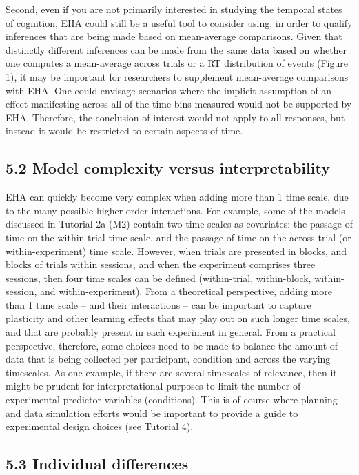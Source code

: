 \documentclass[
  man, donotrepeattitle,floatsintext]{apa6}
\begin{document}
Second, even if you are not primarily interested in studying the temporal states of cognition, EHA could still be a useful tool to consider using, in order to qualify inferences that are being made based on mean-average comparisons. Given that distinctly different inferences can be made from the same data based on whether one computes a mean-average across trials or a RT distribution of events (Figure 1), it may be important for researchers to supplement mean-average comparisons with EHA. One could envisage scenarios where the implicit assumption of an effect manifesting across all of the time bins measured would not be supported by EHA. Therefore, the conclusion of interest would not apply to all responses, but instead it would be restricted to certain aspects of time.

\subsection{5.2 Model complexity versus interpretability}\label{model-complexity-versus-interpretability}

EHA can quickly become very complex when adding more than 1 time scale, due to the many possible higher-order interactions.
For example, some of the models discussed in Tutorial 2a (M2) contain two time scales as covariates: the passage of time on the within-trial time scale, and the passage of time on the across-trial (or within-experiment) time scale. However, when trials are presented in blocks, and blocks of trials within sessions, and when the experiment comprises three sessions, then four time scales can be defined (within-trial, within-block, within-session, and within-experiment).
From a theoretical perspective, adding more than 1 time scale -- and their interactions -- can be important to capture plasticity and other learning effects that may play out on such longer time scales, and that are probably present in each experiment in general.
From a practical perspective, therefore, some choices need to be made to balance the amount of data that is being collected per participant, condition and across the varying timescales. As one example, if there are several timescales of relevance, then it might be prudent for interpretational purposes to limit the number of experimental predictor variables (conditions).
This is of course where planning and data simulation efforts would be important to provide a guide to experimental design choices (see Tutorial 4).

\subsection{5.3 Individual differences}\label{individual-differences}
\end{document}
